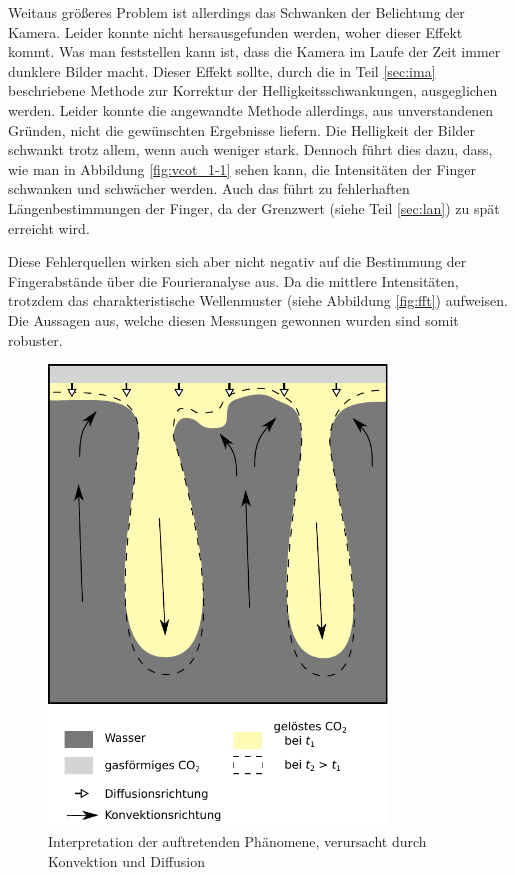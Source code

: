 Weitaus größeres Problem ist allerdings das Schwanken der Belichtung der Kamera. Leider konnte nicht hersausgefunden werden, woher dieser Effekt kommt. Was man feststellen kann ist, dass die Kamera im Laufe der Zeit immer dunklere Bilder macht. Dieser Effekt sollte, durch die in Teil \ref{sec:ima} beschriebene Methode zur Korrektur der Helligkeitsschwankungen, ausgeglichen werden. Leider konnte die angewandte Methode allerdings, aus unverstandenen Gründen, nicht die gewünschten Ergebnisse liefern. Die Helligkeit der Bilder schwankt trotz allem, wenn auch weniger stark. Dennoch führt dies dazu, dass, wie man in Abbildung \ref{fig:vcot_1-1} sehen kann, die Intensitäten der Finger schwanken und schwächer werden. Auch das führt zu fehlerhaften Längenbestimmungen der Finger, da der Grenzwert (siehe Teil \ref{sec:lan}) zu spät erreicht wird.

Diese Fehlerquellen wirken sich aber nicht negativ auf die Bestimmung der Fingerabstände über die Fourieranalyse aus. Da die mittlere Intensitäten, trotzdem das charakteristische Wellenmuster (siehe Abbildung \ref{fig:fft}) aufweisen. Die Aussagen aus, welche diesen Messungen gewonnen wurden sind somit robuster.

\onecolumn


\begin{figure}
 \centering
 \includegraphics[width=9cm]{./plot/Konvektion_Diffusion.pdf}
 \caption{Interpretation der auftretenden Phänomene, verursacht durch Konvektion und Diffusion}
 \label{fig:difkon}
\end{figure}
% 
% 

